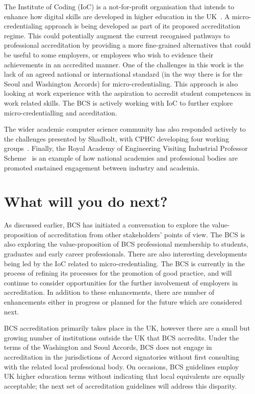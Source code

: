 \documentclass[sigconf]{acmart}
\begin{document}
The Institute of Coding (IoC) is a not-for-profit organisation that
intends to enhance how digital skills are developed in higher
education in the UK~\cite{Davenportetal2019a}. A micro-credentialing
approach is being developed as part of its proposed accreditation
regime. This could potentially augment the current recognised pathways
to professional accreditation by providing a more fine-grained
alternatives that could be useful to some employers, or employees who
wish to evidence their achievements in an accredited manner.  One of
the challenges in this work is the lack of an agreed national or
international standard (in the way there is for the Seoul and
Washington Accords) for micro-credentialing. This approach is also
looking at work experience with the aspiration to accredit student
competences in work related skills. The BCS is actively working with
IoC to further explore micro-credentialling and acceditation.

The wider academic computer science community has also responded
actively to the challenges presented by Shadbolt, with CPHC developing
four working groups~\cite{cphc_2016}.  Finally, the Royal Academy of
Engineering Visiting Industrial Professor Scheme~\cite{royal} is an
example of how national academies and professional bodies are promoted
sustained engagement between industry and academia.

\section {What will you do next?}	

As discussed earlier, BCS has initiated a conversation to explore the
value-proposition of accreditation from other stakeholders' points of
view. The BCS is also exploring the value-proposition of BCS
professional membership to students, graduates and early career
professionals.  There are also interesting developments being led by
the IoC related to micro-credentialing. The BCS is currently in the
process of refining its processes for the promotion of good practice,
and will continue to consider opportunities for the further
involvement of employers in accreditation. In addition to these
enhancements, there are number of enhancements either in progress or
planned for the future which are considered next.

BCS accreditation primarily takes place in the UK, however there are a
small but growing number of institutions outside the UK that BCS
accredits. Under the terms of the Washington and Seoul Accords, BCS
does not engage in accreditation in the jurisdictions of Accord
signatories without first consulting with the related local
professional body.  On occasions, BCS guidelines employ UK higher
education terms without indicating that local equivalents are equally
acceptable; the next set of accreditation guidelines will address this
disparity.
\end{document}
